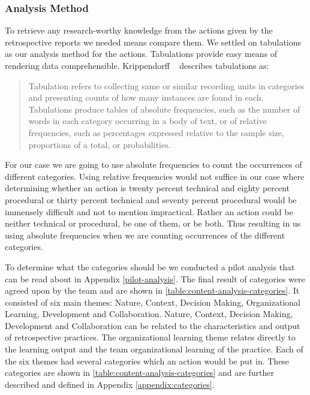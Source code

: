 \subsubsection{Analysis Method}
To retrieve any research-worthy knowledge from the actions given by the retrospective reports we needed means compare them. We settled on tabulations as our analysis method for the actions. Tabulations provide easy means of rendering data comprehensible. Krippendorff ~\cite{Krippendorff2004} describes tabulations as: 

\begin{quote}
Tabulation refers to collecting same or similar recording units in categories and presenting counts of how many instances are found in each. Tabulations produce tables of absolute frequencies, such as the number of words in each category occurring in a body of text, or of relative frequencies, such as percentages expressed relative to the sample size, proportions of a total, or probabilities.
\end{quote}

For our case we are going to use absolute frequencies to count the occurrences of different categories. Using relative frequencies would not suffice in our case where determining whether an action is twenty percent technical and eighty percent procedural or thirty percent technical and seventy percent procedural would be immensely difficult and not to mention impractical. Rather an action could be neither technical or procedural, be one of them, or be both. Thus resulting in us using absolute frequencies when we are counting occurrences of the different categories. 

To determine what the categories should be we conducted a pilot analysis that can be read about in Appendix \autoref{pilot-analysis}. The final result of categories were agreed upon by the team and are shown in \autoref{table:content-analysis-categories}. It consisted of six main themes: Nature, Context, Decision Making, Organizational Learning, Development and Collaboration. Nature, Context, Decision Making, Development and Collaboration can be related to the characteristics and output of retrospective practices. The organizational learning theme relates directly to the learning output and the team organizational learning of the practice. Each of the six themes had several categories which an action would be put in. These categories are shown in \autoref{table:content-analysis-categories} and are further described and defined in Appendix \autoref{appendix:categories}. 

